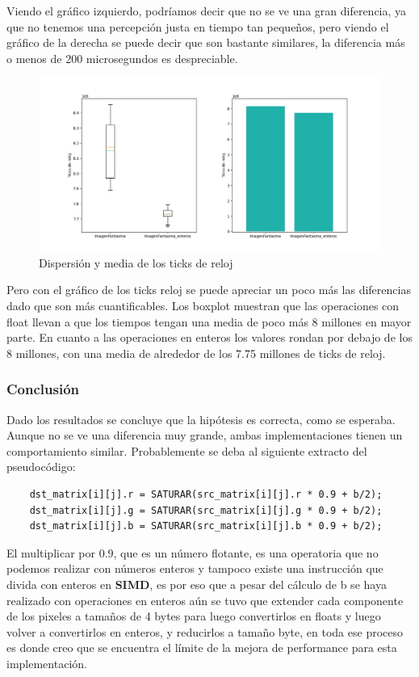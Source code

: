 Viendo el gráfico izquierdo, podríamos decir que no se ve una gran diferencia, ya que no tenemos una percepción justa en tiempo tan pequeños, pero viendo el gráfico de la derecha se puede decir que son bastante similares, la diferencia más o menos de 200 microsegundos es despreciable.

\begin{figure}
    \begin{center}
	\includegraphics[scale=0.50]{img/enteros2.jpeg}
    \end{center}
	\caption{Dispersión y media de los ticks de reloj}
	\label{exp1_c}
\end{figure}

Pero con el gráfico de los ticks reloj se puede apreciar un poco más las diferencias dado que son más cuantificables. Los boxplot muestran que las operaciones con float llevan a que los tiempos tengan una media de poco más 8 millones en mayor parte. En cuanto a las operaciones en enteros los valores rondan por debajo de los 8 millones, con una media de alrededor de los 7.75 millones de ticks de reloj.

\subsubsection{Conclusión}
Dado los resultados se concluye que la hipótesis es correcta, como se esperaba. Aunque no se ve una diferencia muy grande, ambas implementaciones tienen un comportamiento similar.
Probablemente se deba al siguiente extracto del pseudocódigo:
\begin{codesnippet}
\begin{verbatim}
    dst_matrix[i][j].r = SATURAR(src_matrix[i][j].r * 0.9 + b/2);
    dst_matrix[i][j].g = SATURAR(src_matrix[i][j].g * 0.9 + b/2);
    dst_matrix[i][j].b = SATURAR(src_matrix[i][j].b * 0.9 + b/2);
\end{verbatim}
\end{codesnippet}
El multiplicar por 0.9, que es un número flotante, es una operatoria que no podemos realizar con números enteros y tampoco existe una instrucción que divida con enteros en \textbf{SIMD}, es por eso que a pesar del cálculo de b se haya realizado con operaciones en enteros aún se tuvo que extender cada componente de los pixeles a tamaños de 4 bytes para luego convertirlos en floats y luego volver a convertirlos en enteros, y reducirlos a tamaño byte, en toda ese proceso es donde creo que se encuentra el límite de la mejora de performance para esta implementación.
